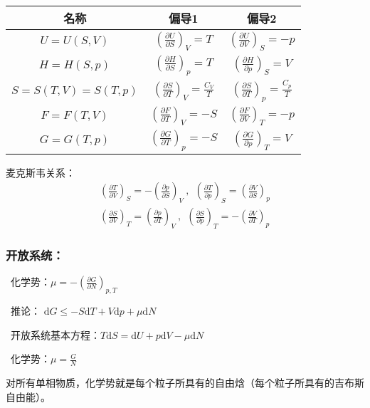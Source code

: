 \documentclass[zihao=-4,UTF8]{report}
\begin{document}
\begin{table}[H]
    \centering
    \begin{tabular}{ccc} 
    \toprule
    名称 & 偏导1 & 偏导2  \\
    \midrule
    $U = U(S,V)$ & $\left(\frac{\partial U}{\partial S}\right)_V = T$ & $\left(\frac{\partial U}{\partial V}\right)_S =-p $ \\
    $H = H(S,p)$ & $\left(\frac{\partial H}{\partial S}\right)_p = T$ & $\left(\frac{\partial H}{\partial p}\right)_S = V $ \\
    $S = S(T,V) = S(T,p)$ & $\left(\frac{\partial S}{\partial T}\right)_V = \frac{C_V}{T}$ & $\left(\frac{\partial S}{\partial T}\right)_p =\frac{C_p}{T} $ \\
    $F = F(T,V)$ & $\left(\frac{\partial F}{\partial T}\right)_V = -S$ & $\left(\frac{\partial F}{\partial V}\right)_T = -p$ \\
    $G = G(T,p)$ & $\left(\frac{\partial G}{\partial T}\right)_p = -S$ & $\left(\frac{\partial G}{\partial p }\right)_T = V$ \\
    \bottomrule
    \end{tabular}
\end{table}
麦克斯韦关系：
\begin{gather*}
    \left(\frac{\partial T}{\partial V}\right)_S = - \left(\frac{\partial p}{\partial S}\right)_V \ ,\ \ \left(\frac{\partial T}{\partial p}\right)_S = \left(\frac{\partial V}{\partial S}\right)_p \\
    \left(\frac{\partial S}{\partial V}\right)_T =\left(\frac{\partial p}{\partial T}\right)_V\ ,\ \ \left(\frac{\partial S}{\partial p}\right)_T = -\left(\frac{\partial V}{\partial T}\right)_p   
\end{gather*}

\subsubsection{开放系统：}
\par{}\  化学势：$\mu = -\left(\frac{\partial G}{\partial N}\right)_{p,T}$\par
{}\  推论： $\mathrm{d}G \le -S\mathrm{d}T + V\mathrm{d}p +\mu \mathrm{d}N$  \par
{}\   开放系统基本方程：$T\mathrm{d}S = \mathrm{d}U + p\mathrm{d}V - \mu \mathrm{d}N$  \par
{}\   化学势：$\mu =\frac{G}{N}$  \par
{\par\color{gray}\small
对所有单相物质，化学势就是每个粒子所具有的自由焓（每个粒子所具有的吉布斯自由能）。
\par}
\end{document}
